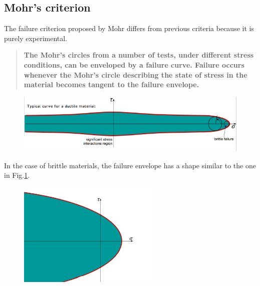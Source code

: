 \documentclass[class=report, crop=false, 12pt,a4paper]{standalone}
\begin{document}
\subsection{Mohr's criterion}
The failure criterion proposed by Mohr differs from previous criteria because it is purely experimental.
\begin{quotation}
  \textbf{The Mohr's circles from a number of tests, under different stress conditions, can be enveloped by a failure curve. Failure occurs whenever the Mohr's circle describing the state of stress in the material becomes tangent to the failure envelope.}
\end{quotation}
\begin{figure}[H]
  \centering
  \includegraphics[width = \textwidth]{../img/diagram98.png}
  \caption{}
\end{figure}
In the case of brittle materials, the failure envelope has a shape similar to the one in Fig.\ref{mohrscriterion1}.
\begin{figure}[H]
  \centering
  \includegraphics[height = 5cm]{../img/diagram99.png}
  \caption{}
  \label{mohrscriterion1}
\end{figure}
\end{document}
